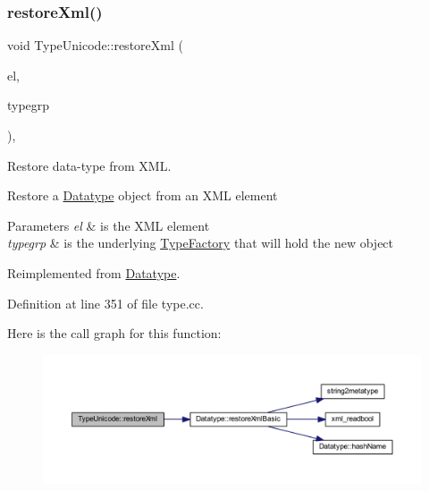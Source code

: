\subsubsection{\texorpdfstring{restoreXml()}{restoreXml()}}
{\footnotesize\ttfamily void Type\+Unicode\+::restore\+Xml (\begin{DoxyParamCaption}\item[{const \mbox{\hyperlink{class_element}{Element}} $\ast$}]{el,  }\item[{\mbox{\hyperlink{class_type_factory}{Type\+Factory}} \&}]{typegrp }\end{DoxyParamCaption})\hspace{0.3cm}{\ttfamily [protected]}, {\ttfamily [virtual]}}



Restore data-\/type from X\+ML. 

Restore a \mbox{\hyperlink{class_datatype}{Datatype}} object from an X\+ML element 
\begin{DoxyParams}{Parameters}
{\em el} & is the X\+ML element \\
\hline
{\em typegrp} & is the underlying \mbox{\hyperlink{class_type_factory}{Type\+Factory}} that will hold the new object \\
\hline
\end{DoxyParams}


Reimplemented from \mbox{\hyperlink{class_datatype_aed882ae693a31a64d56fffb9abdaa575}{Datatype}}.



Definition at line 351 of file type.\+cc.

Here is the call graph for this function\+:
\nopagebreak
\begin{figure}[H]
\begin{center}
\leavevmode
\includegraphics[width=350pt]{class_type_unicode_a3158417117649e59ffe402137c22bb67_cgraph}
\end{center}
\end{figure}
\mbox{\label{class_type_unicode_a4dada4691cd95b817fc6a0bd99031cd6}} 
